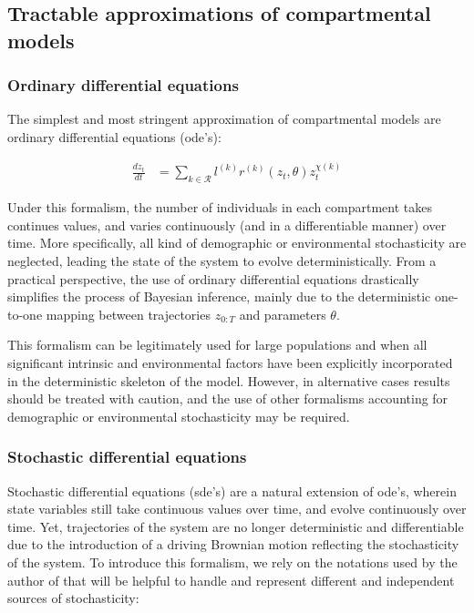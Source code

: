 \documentclass[a4paper,11pt,titlepage]{article}
\theoremstyle{plain} %
\begin{document}
\subsection{Tractable approximations of compartmental models}
\subsubsection{\label{subsub:ode}Ordinary differential equations}

The simplest and most stringent approximation of compartmental models are ordinary differential equations (ode's):

\begin{align}
	\frac{dz_t}{dt}&=  \sum_{k \in \mathcal{R}} l^{(k)}  r^{(k)} (z_t,\theta) z^{\chi(k)}_t
\end{align}


Under this formalism, the number of individuals in each compartment takes continues values, and varies continuously (and in a differentiable manner) over time. More specifically, all kind of demographic or environmental stochasticity are neglected, leading  the state of the system to evolve deterministically. From a practical perspective, the use of ordinary differential equations drastically simplifies the process of Bayesian inference, mainly due to the deterministic one-to-one mapping between trajectories $z_{0:T}$ and parameters $\theta$.

This formalism can be legitimately used for large populations and when all significant intrinsic and environmental factors have been explicitly incorporated in the deterministic skeleton of the model. However, in alternative cases results should be treated with caution, and the use of other formalisms accounting for  demographic or environmental stochasticity may be required.



\subsubsection{\label{subsub:sde}Stochastic differential equations}

Stochastic differential equations (sde's) are a natural extension of ode's, wherein state variables still take continuous values over time, and evolve continuously over time. Yet, trajectories of the system are no longer deterministic and differentiable due to the introduction of a driving Brownian motion reflecting the stochasticity of the system. To introduce this formalism, we rely on the notations used by the author of \cite{Sarkka2006} that will be helpful to handle and represent different and independent sources of stochasticity:
\end{document}
